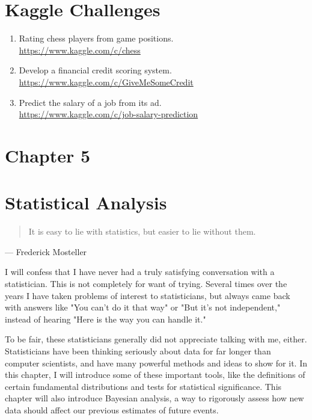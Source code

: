 \documentclass[10pt]{article}
\begin{document}
\section*{Kaggle Challenges}
\begin{enumerate}
    \item Rating chess players from game positions.\\ \url{https://www.kaggle.com/c/chess}
    \item Develop a financial credit scoring system.\\ \url{https://www.kaggle.com/c/GiveMeSomeCredit}
    \item Predict the salary of a job from its ad.\\ \url{https://www.kaggle.com/c/job-salary-prediction}
\end{enumerate}

\section*{Chapter 5}
\section*{Statistical Analysis}
\begin{quote}
It is easy to lie with statistics, but easier to lie without them.
\end{quote}

\begin{flushright}
— Frederick Mosteller
\end{flushright}

I will confess that I have never had a truly satisfying conversation with a statistician. This is not completely for want of trying. Several times over the years I have taken problems of interest to statisticians, but always came back with answers like "You can't do it that way" or "But it's not independent," instead of hearing "Here is the way you can handle it."

To be fair, these statisticians generally did not appreciate talking with me, either. Statisticians have been thinking seriously about data for far longer than computer scientists, and have many powerful methods and ideas to show for it. In this chapter, I will introduce some of these important tools, like the definitions of certain fundamental distributions and tests for statistical significance. This chapter will also introduce Bayesian analysis, a way to rigorously assess how new data should affect our previous estimates of future events.\\
\end{document}

